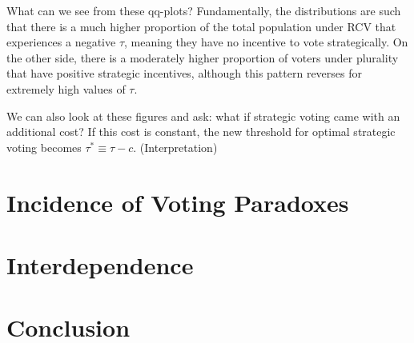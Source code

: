 \documentclass[11pt, letter, margin = 2 in]{article}
\begin{document}
What can we see from these qq-plots? Fundamentally, the distributions are such that there is a much higher proportion of the total population under RCV that experiences a negative $\tau$, meaning they have no incentive to vote strategically. On the other side, there is a moderately higher proportion of voters under plurality that have positive strategic incentives, although this pattern reverses for extremely high values of $\tau$.

We can also look at these figures and ask: what if strategic voting came with an additional cost? If this cost is constant, the new threshold for optimal strategic voting becomes $\tau^* \equiv \tau - c$. (Interpretation)

\section{Incidence of Voting Paradoxes}

\section{Interdependence}

\section{Conclusion}
\end{document}
